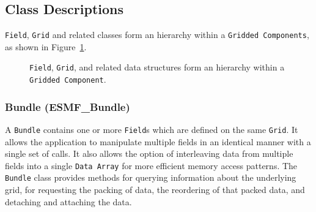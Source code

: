 \subsection{Class Descriptions}

{\tt Field}, {\tt Grid} and related classes form an hierarchy within 
a {\tt Gridded Components}, as shown in Figure~\ref{fig:datastruct}.

\begin{figure}
\caption[{Hierarchy of Data Structures}]{{\tt Field}, {\tt Grid}, and 
related data structures form an hierarchy within a {\tt Gridded Component}.}
\label{fig:datastruct}
\end{figure}


\subsubsection{Bundle (ESMF\_Bundle)}
\label{sec:bundle} 
A {\tt Bundle} contains one or more {\tt Field}s which are defined on 
the same {\tt Grid}.  It allows the application to manipulate multiple fields in 
an identical manner with a single set of calls.  It also allows the option 
of interleaving data from multiple fields into a single {\tt Data Array} for 
more efficient memory access patterns.  The {\tt Bundle} class provides methods 
for querying information about the underlying grid, for requesting the 
packing of data, the reordering of that packed data, and detaching and 
attaching the data.

